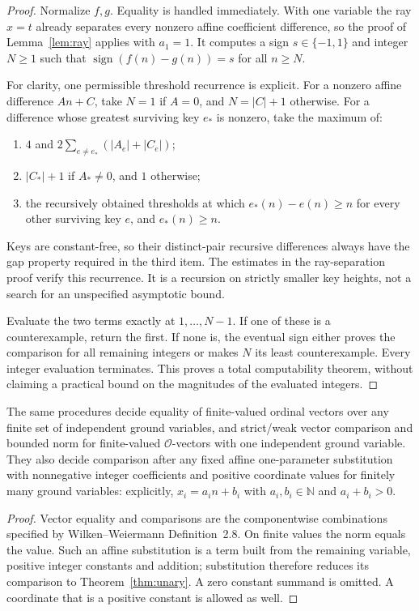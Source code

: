 \documentclass[11pt]{article}
\begin{document}
\begin{proof}
Normalize $f,g$.  Equality is handled immediately.  With one variable
the ray $x=t$ already separates every nonzero affine coefficient
difference, so the proof of Lemma~\ref{lem:ray} applies with $a_1=1$.
It computes a sign $s\in\{-1,1\}$ and integer $N\ge1$ such that
$\operatorname{sign}(f(n)-g(n))=s$ for all $n\ge N$.

For clarity, one permissible threshold recurrence is explicit.  For a
nonzero affine difference $An+C$, take $N=1$ if $A=0$, and
$N=|C|+1$ otherwise.  For a difference whose greatest surviving key
$e_*$ is nonzero, take the maximum of:
\begin{enumerate}
\item $4$ and $2\sum_{e\ne e_*}(|A_e|+|C_e|)$;
\item $|C_*|+1$ if $A_*\ne0$, and $1$ otherwise;
\item the recursively obtained thresholds at which
      $e_*(n)-e(n)\ge n$ for every other surviving key $e$, and
      $e_*(n)\ge n$.
\end{enumerate}
Keys are constant-free, so their distinct-pair recursive differences
always have the gap property required in the third item.  The estimates in the ray-separation proof verify this recurrence.  It is a recursion
on strictly smaller key heights, not a search for an unspecified
asymptotic bound.

Evaluate the two terms exactly at $1,\ldots,N-1$.  If one of these is
a counterexample, return the first.  If none is, the eventual sign
either proves the comparison for all remaining integers or makes $N$
its least counterexample.  Every integer evaluation terminates.
This proves a total computability theorem, without claiming a practical
bound on the magnitudes of the evaluated integers.
\end{proof}

\begin{corollary}\label{cor:consumers}
The same procedures decide equality of finite-valued ordinal vectors
over any finite set of independent ground variables, and strict/weak
vector comparison and bounded norm for finite-valued $\mathcal O$-vectors
with one independent ground variable.  They also decide comparison
after any fixed affine one-parameter substitution with nonnegative
integer coefficients and positive coordinate values for finitely many
ground variables: explicitly,
$x_i=a_i n+b_i$ with $a_i,b_i\in\mathbb N$ and $a_i+b_i>0$.
\end{corollary}
\begin{proof}
Vector equality and comparisons are the componentwise combinations
specified by Wilken--Weiermann Definition~2.8.  On finite values the
norm equals the value.  Such an affine substitution is a term built
from the remaining variable, positive integer constants and addition;
substitution therefore reduces its comparison to
Theorem~\ref{thm:unary}.  A zero constant summand is omitted.  A
coordinate that is a positive constant is allowed as well.
\end{proof}
\end{document}
